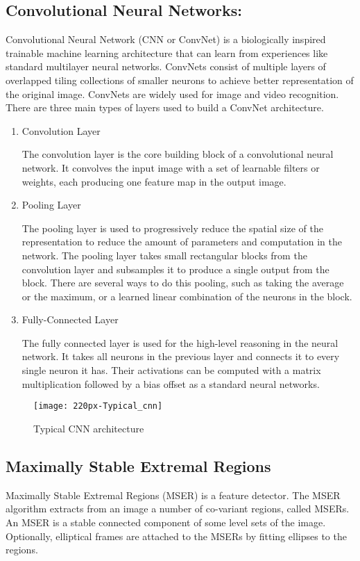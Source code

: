     \subsection{Convolutional Neural Networks:}
Convolutional Neural Network (CNN or ConvNet) is a biologically inspired trainable machine learning architecture that can learn from experiences like standard multilayer neural networks. ConvNets consist of multiple layers of overlapped tiling collections of smaller neurons to achieve better representation of the original image. ConvNets are widely used for image and video recognition. There are three main types of layers used to build a ConvNet architecture.

        \begin{enumerate}
        \item Convolution Layer
        
The convolution layer is the core building block of a convolutional neural network. It convolves the input image with a set of learnable filters or weights, each producing one feature map in the output image.

        \item Pooling Layer
        
The pooling layer is used to progressively reduce the spatial size of the representation to reduce the amount of parameters and computation in the network. The pooling layer takes small rectangular blocks from the convolution layer and subsamples it to produce a single output from the block. There are several ways to do this pooling, such as taking the average or the maximum, or a learned linear combination of the neurons in the block.

        \item Fully-Connected Layer
        
The fully connected layer is used for the high-level reasoning in the neural network. It takes all neurons in the previous layer and connects it to every single neuron it has. Their activations can be computed with a matrix multiplication followed by a bias offset as a standard neural networks.

\end{enumerate}

\begin{figure}[htb]
\centering
\texttt{[image: 220px-Typical\_cnn]}
\caption{Typical CNN architecture}
\end{figure}

    \subsection{ Maximally Stable Extremal Regions}
Maximally Stable Extremal Regions (MSER) is a feature detector. The MSER algorithm extracts from an image a number of co-variant regions, called MSERs. An MSER is a stable connected component of some level sets of the image. Optionally, elliptical frames are attached to the MSERs by fitting ellipses to the regions.
